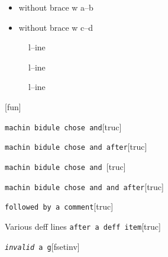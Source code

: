 \documentclass{book}
\begin{document}
\begin{itemize}[label={}]
\item without brace w a--b
\item without brace w c--d
\end{itemize}

\begin{description}
\item[{\parbox[b]{\linewidth}{%
a}}]
l--ine
\end{description}

\begin{description}
\item[{\parbox[b]{\linewidth}{%
a--missing style formatting}}]
l--ine
\end{description}

\begin{description}
\item[{\parbox[b]{\linewidth}{%
a\\
\index[fn]{a@\texttt{a}}%
\index[cp]{index entry between item and itemx}%
b
\index[fn]{b@\texttt{b}}%
}}]
l--ine
\end{description}

\noindent\texttt\bgroup{}\egroup{}\hfill[fun]



\noindent\texttt\bgroup{}machin bidule chose and\egroup{}\hfill[truc]



%
\noindent\texttt\bgroup{}machin bidule chose and  after\egroup{}\hfill[truc]



%
\noindent\texttt\bgroup{}machin bidule chose and \egroup{}\hfill[truc]



%
\noindent\texttt\bgroup{}machin bidule chose and and after\egroup{}\hfill[truc]



%
\noindent\texttt\bgroup{}followed by a comment\egroup{}\hfill[truc]



%
Various deff lines
\noindent\texttt\bgroup{}after a deff item\egroup{}\hfill[truc]



%

\noindent\texttt\bgroup{}\emph{invalid} a g\egroup{}\hfill[fsetinv]
\end{document}
